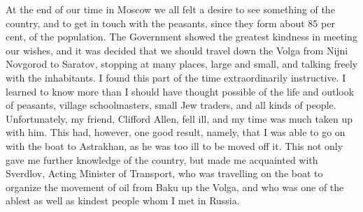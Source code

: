 At the end of our time in Moscow we all felt a desire to see something of the country, and to get in touch with the peasants, since they form about 85 per cent, of the population. The Government showed the greatest kindness in meeting our wishes, and it was decided that we should travel down the Volga from Nijni Novgorod to Saratov, stopping at many places, large and small, and talking freely with the inhabitants. I found this part of the time extraordinarily instructive. I learned to know more than I should have thought possible of the life and outlook of peasants, village schoolmasters, small Jew traders, and all kinds of people. Unfortunately, my friend, Clifford Allen, fell ill, and my time was much taken up with him. This had, however, one good result, namely, that I was able to go on with the boat to Astrakhan, as he was too ill to be moved off it. This not only gave me further knowledge of the country, but made me acquainted with Sverdlov, Acting Minister of Transport, who was travelling on the boat to organize the movement of oil from Baku up the Volga, and who was one of the ablest as well as kindest people whom I met in Russia.

